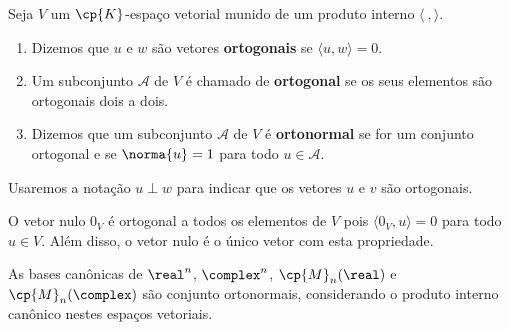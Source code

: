 \begin{definicao}
	Seja $V$ um $\cp{K}$-espa\c{c}o vetorial munido de um produto interno $\langle\ , \rangle$.
	\begin{enumerate}[label={\roman*})]
		\item Dizemos que $u$ e $w$ s\~ao vetores \textbf{ortogonais} se $\langle u, w \rangle = 0$.
		\item Um subconjunto $\mathcal{A}$ de $V$ \'e chamado de \textbf{ortogonal} se os seus elementos s\~ao ortogonais dois a dois.
		\item Dizemos que um subconjunto $\mathcal{A}$ de $V$ \'e \textbf{ortonormal} se for um conjunto ortogonal e se $\norma{u} = 1$ para todo $u \in \mathcal{A}$.
	\end{enumerate}
\end{definicao}

\begin{notacao}
	Usaremos a nota\c{c}\~ao $u \perp w$ para indicar que os vetores $u$ e $v$ s\~ao ortogonais.
\end{notacao}

\begin{observacao}
	O vetor nulo $0_V$ \'e ortogonal a todos os elementos de $V$ pois $\langle 0_V, u \rangle = 0$ para todo $u \in V$. Al\'em disso, o vetor nulo \'e o \'unico vetor com esta propriedade.
\end{observacao}

\begin{exemplo}
	As bases can\^onicas de $\real^n$, $\complex^n$, $\cp{M}_n(\real)$ e $\cp{M}_n(\complex)$ s\~ao conjunto ortonormais, considerando o produto interno can\^onico nestes espa\c{c}os vetoriais.
\end{exemplo}

